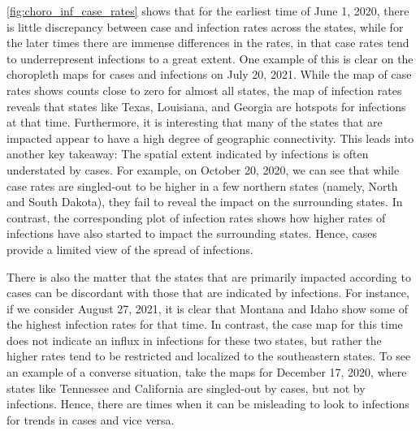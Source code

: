 \documentclass{article}
\begin{document}
\autoref{fig:choro_inf_case_rates} shows that for the
earliest time of June 1, 2020, there is little discrepancy between case and
infection rates across the states, while for the later times there are immense differences in the
rates, in that case rates tend to underrepresent infections to a great extent.  %
One example of this is clear on the choropleth maps for cases and infections on July 20, 2021. While the map of case rates shows counts close to zero for almost all states, the map of infection rates reveals that states like Texas, Louisiana, and Georgia are hotspots for infections at that time. Furthermore, it is interesting that many of the states that are impacted appear to have a high degree of geographic connectivity. 
This leads into another key takeaway: The spatial extent indicated by infections is often understated by cases. For example, on October 20, 2020, we can see that while case rates are singled-out to be higher in a few northern states (namely, North and South Dakota), they fail to reveal the impact on the surrounding states. In contrast, the corresponding plot of infection rates shows how higher rates of infections have also started to impact the surrounding states. Hence, cases provide a limited view of the spread of infections. 

There is also the matter that the states that are primarily impacted according to cases can be discordant with those that are indicated by infections. For instance, if we consider August 27, 2021, it is clear that Montana and Idaho show some of the highest infection rates for that time. In contrast, the case map for this time does not indicate an influx in infections for these two states, but rather the higher rates tend to be restricted and localized to the southeastern states. To see an example of a converse situation, take the maps for December 17, 2020, where states like Tennessee and California are singled-out by cases, but not by infections. Hence, there are times when it can be misleading to look to infections for trends in cases and vice versa.
\end{document}

